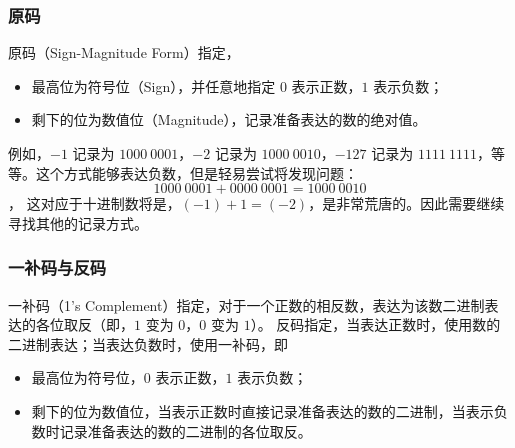         \subsubsection{原码}\label{subsubsec:ArithBasics/positional-notation-presentation/binary/sign-magnitude}
            原码（Sign-Magnitude Form）指定，
            \begin{itemize}
                \item 最高位为符号位（Sign），并任意地指定 $0$ 表示正数，$1$ 表示负数；
                \item 剩下的位为数值位（Magnitude），记录准备表达的数的绝对值。
            \end{itemize}
            例如，$-1$ 记录为 $1000\ 0001$，$-2$ 记录为 $1000\ 0010$，$-127$ 记录为 $1111\ 1111$，等等。这个方式能够表达负数，但是轻易尝试将发现问题：
            \[1000\ 0001 + 0000\ 0001 = 1000\ 0010\]，
            这对应于十进制数将是，$(-1) + 1 = (-2)$，是非常荒唐的。因此需要继续寻找其他的记录方式。

        \subsubsection{一补码与反码}\label{subsubsec:ArithBasics/positional-notation-presentation/binary/one-complement}
            一补码（1's Complement）指定，对于一个正数的相反数，表达为该数二进制表达的各位取反（即，$1$ 变为 $0$，$0$ 变为 $1$）。
            反码指定，当表达正数时，使用数的二进制表达；当表达负数时，使用一补码，即
            \begin{itemize}
                \item 最高位为符号位，$0$ 表示正数，$1$ 表示负数；
                \item 剩下的位为数值位，当表示正数时直接记录准备表达的数的二进制，当表示负数时记录准备表达的数的二进制的各位取反。
            \end{itemize}
